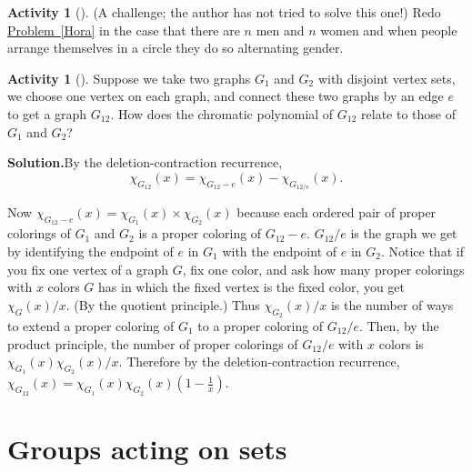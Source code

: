 \documentclass[10pt,]{book}
\theoremstyle{plain}
\theoremstyle{definition}
\newtheorem{activity}[project]{Activity}
\numberwithin{equation}{chapter}
\begin{document}
\begin{activity}[]\label{activity-246}
(A challenge; the author has not tried to solve this one!) Redo \hyperref[Hora]{Problem~\ref{Hora}} in the case that there are \(n\) men and \(n\) women and when people arrange themselves in a circle they do so alternating gender.%
\end{activity}
\begin{activity}[]\label{activity-247}
Suppose we take two graphs \(G_1\) and \(G_2\) with disjoint vertex sets, we choose one vertex on each graph, and connect these two graphs by an edge \(e\) to get a graph \(G_{12}\). How does the chromatic polynomial of \(G_{12}\) relate to those of \(G_1\) and \(G_2\)?%
\par\medskip\noindent%
\textbf{Solution.}\quad By the deletion-contraction recurrence,%
\begin{equation*}
\chi_{G_{12}}(x) =
\chi_{G_{12}-e}(x)-\chi_{G_{12/e}}(x).
\end{equation*}
%
\par
Now \(\chi_{G_{12}-e}(x)=\chi_{G_1}(x)\times \chi_{G_2}(x)\) because each ordered pair of proper colorings of \(G_1\) and \(G_2\) is a proper coloring of \(G_{12}-e\). \(G_{12}/e\) is the graph we get by identifying the endpoint of \(e\) in \(G_1\) with the endpoint of \(e\) in \(G_2\). Notice that if you fix one vertex of a graph \(G\), fix one color, and ask how many proper colorings with \(x\) colors \(G\) has in which the fixed vertex is the fixed color, you get \(\chi_G(x)/x\).  (By the quotient principle.) Thus \(\chi_{G_2}(x)/x\) is the number of ways to extend a proper coloring of \(G_1\) to a proper coloring of \(G_{12}/e\). Then, by the product principle, the number of proper colorings of \(G_{12}/e\) with \(x\) colors is \(\chi_{G_1}(x)\chi_{G_2}(x)/x\). Therefore by the deletion-contraction recurrence, \(\chi_{G_{12}}(x) = \chi_{G_1}(x)\chi_{G_2}(x)(1-\frac{1}{x})\).%
\end{activity}
\typeout{************************************************}
\typeout{************************************************}
\chapter[{Groups acting on sets}]{Groups acting on sets}\label{groupsonsets}
\typeout{************************************************}
\typeout{************************************************}
\end{document}
